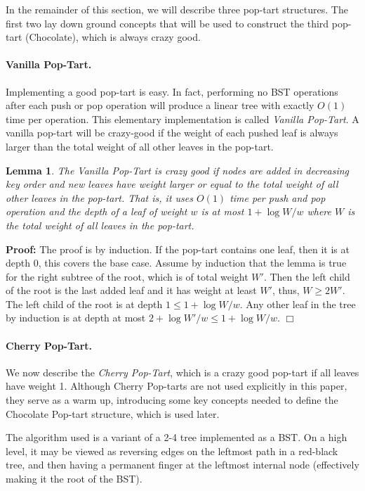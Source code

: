 \documentclass[11pt]{article}
\newtheorem{lemma}[theorem]{Lemma}
\newenvironment{proof}{\noindent\textbf{Proof: }\ignorespaces}
  {\hspace*{\fill}$\Box$\medskip}
\begin{document}
In the remainder of this section, we will describe three pop-tart
structures. The first two lay down ground concepts that will be used to
construct the third pop-tart (Chocolate), which is always crazy good.

\paragraph{Vanilla Pop-Tart.}
Implementing a good pop-tart is easy. In fact, performing no BST
operations after each push or pop operation will produce a linear tree
with exactly $O(1)$ time per operation. This elementary implementation
is called \emph{Vanilla Pop-Tart}.  A vanilla pop-tart will be
crazy-good if the weight of each pushed leaf is always larger than the
total weight of all other leaves in the pop-tart.

\begin{lemma}
The Vanilla Pop-Tart is crazy good if nodes are added in decreasing key
order and new leaves have weight larger or equal to the total weight of
all other leaves in the pop-tart.  That is, it uses $O(1)$ time per push
and pop operation and the depth of a leaf of weight $w$ is at most
$1+\log W/w$ where $W$ is the total weight of all leaves in the
pop-tart.
\end{lemma}
\begin{proof}
The proof is by induction. If the pop-tart contains one leaf, then it is
at depth 0, this covers the base case.  Assume by induction that the
lemma is true for the right subtree of the root, which is of total
weight $W'$. Then the left child of the root is the last added leaf and
it has weight at least $W'$, thus, $W \geq 2W'$. The left child of the
root is at depth $1 \leq 1+\log{W/w}$. Any other leaf in the tree by
induction is at depth at most $2+\log{W'/w} \leq 1+\log{W/w}$.
\end{proof}

\paragraph{Cherry Pop-Tart.}
We now describe the \emph{Cherry Pop-Tart}, which is a crazy good
pop-tart if all leaves have weight 1. Although Cherry Pop-tarts are not
used explicitly in this paper, they serve as a warm up, introducing some
key concepts needed to define the Chocolate Pop-tart structure, which is
used later.

The algorithm used is a variant of a 2-4 tree implemented as a BST.  On
a high level, it may be viewed as reversing edges on the leftmost path
in a red-black tree, and then having a permanent finger at the leftmost
internal node (effectively making it the root of the BST).
\end{document}
